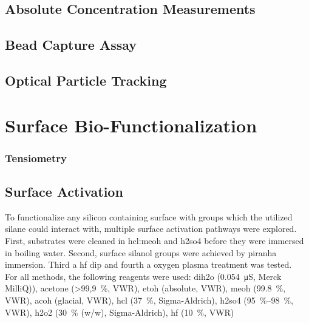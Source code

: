 \subsection{Absolute Concentration Measurements}



\subsection{Bead Capture Assay}

\subsection{Optical Particle Tracking}


\section{Surface Bio-Functionalization}


\subsubsection{Tensiometry}


\subsection{Surface Activation}
\label{sec:meth:surfActiv}
To functionalize any silicon containing surface with  groups which the utilized silane could interact with, multiple surface activation pathways were explored. First, substrates were cleaned in \gls{hcl}:\gls{meoh} and \gls{h2so4} before they were immersed in boiling water. Second, surface silanol groups were achieved by piranha immersion. Third a \gls{hf} dip and fourth a oxygen plasma treatment was tested.\\
For all methods, the following reagents were used: \gls{dih2o} (\SI{0,054}{\micro\siemens}, Merck MilliQ)), acetone (\SI{>99,9}{\percent}, VWR), \gls{etoh} (absolute, VWR), \gls{meoh} (\SI{99.8}{\percent}, VWR), \gls{acoh} (glacial, VWR), \gls{hcl} (\SI{37}{\percent}, Sigma-Aldrich), \gls{h2so4} (\SIrange{95}{98}{\percent}, VWR), \gls{h2o2} (\SI{30}{\percent} (w/w), Sigma-Aldrich), \gls{hf} (\SI{10}{\percent}, VWR)

